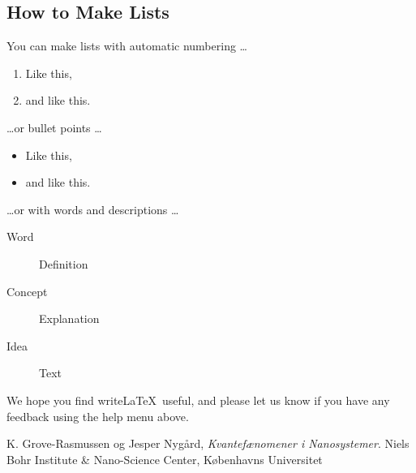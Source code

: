 \documentclass[a4paper]{article}
\begin{document}
\subsection{How to Make Lists}

You can make lists with automatic numbering \dots

\begin{enumerate}
\item Like this,
\item and like this.
\end{enumerate}
\dots or bullet points \dots
\begin{itemize}
\item Like this,
\item and like this.
\end{itemize}
\dots or with words and descriptions \dots
\begin{description}
\item[Word] Definition
\item[Concept] Explanation
\item[Idea] Text
\end{description}

We hope you find write\LaTeX\ useful, and please let us know if you have any feedback using the help menu above.

\begin{thebibliography}{9}
  K. Grove-Rasmussen og Jesper Nygård,
  \emph{Kvantefænomener i Nanosystemer}.
  Niels Bohr Institute \& Nano-Science Center, Københavns Universitet

\end{thebibliography}
\end{document}
